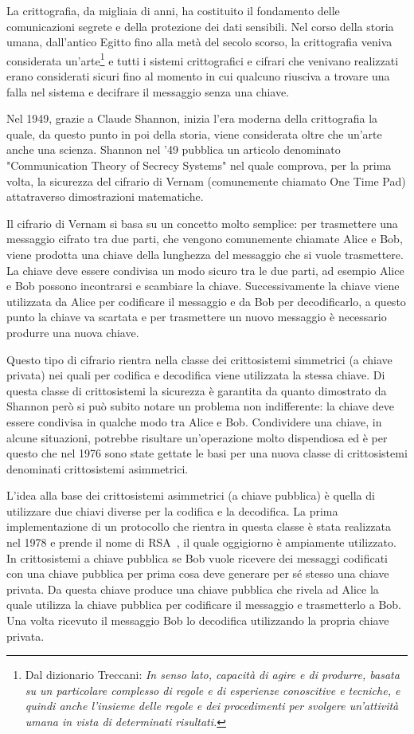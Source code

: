 La crittografia, da migliaia di anni, ha costituito il fondamento delle comunicazioni segrete e della protezione dei dati sensibili. 
Nel corso della storia umana, dall'antico Egitto fino alla met\`a del secolo scorso, la crittografia veniva considerata un'arte\footnote{Dal dizionario Treccani: \textit{In senso lato, capacità di agire e di produrre, basata su un particolare complesso di regole e di esperienze conoscitive e tecniche, e quindi anche l’insieme delle regole e dei procedimenti per svolgere un’attività umana in vista di determinati risultati.}} e tutti i sistemi crittografici e cifrari che venivano realizzati erano considerati sicuri fino al momento in cui qualcuno riusciva a trovare una falla nel sistema e decifrare il messaggio senza una chiave.

Nel 1949, grazie a Claude Shannon, inizia l'era moderna della crittografia la quale, da questo punto in poi della storia, viene considerata oltre che un'arte anche una scienza. Shannon nel '49 pubblica un articolo denominato "Communication Theory of Secrecy Systems"\cite{6769090} nel quale comprova, per la prima volta, la sicurezza del cifrario di Vernam (comunemente chiamato One Time Pad) attatraverso dimostrazioni matematiche.

Il cifrario di Vernam si basa su un concetto molto semplice: per trasmettere una messaggio cifrato tra due parti, che vengono comunemente chiamate Alice e Bob, viene prodotta una chiave della lunghezza del messaggio che si vuole trasmettere. La chiave deve essere condivisa un modo sicuro tra le due parti, ad esempio Alice e Bob possono incontrarsi e scambiare la chiave. Successivamente la chiave viene utilizzata da Alice per codificare il messaggio e da Bob per decodificarlo, a questo punto la chiave va scartata e per trasmettere un nuovo messaggio \`e necessario produrre una nuova chiave. 

Questo tipo di cifrario rientra nella classe dei crittosistemi simmetrici (a chiave privata) nei quali per codifica e decodifica viene utilizzata la stessa chiave. Di questa classe di crittosistemi la sicurezza \`e garantita da quanto dimostrato da Shannon per\`o si pu\`o subito notare un problema non indifferente: la chiave deve essere condivisa in qualche modo tra Alice e Bob. Condividere una chiave, in alcune situazioni, potrebbe risultare un'operazione molto dispendiosa ed \`e per questo che nel 1976 sono state gettate le basi per una nuova classe di crittosistemi denominati crittosistemi asimmetrici\cite{1055638}.

L'idea alla base dei crittosistemi asimmetrici (a chiave pubblica) \`e quella di utilizzare due chiavi diverse per la codifica e la decodifica. La prima implementazione di un protocollo che rientra in questa classe \`e stata realizzata nel 1978 e prende il nome di RSA~\cite{rivest1978method}, il quale oggigiorno \`e ampiamente utilizzato. In crittosistemi a chiave pubblica se Bob vuole ricevere dei messaggi codificati con una chiave pubblica per prima cosa deve generare per s\'e stesso una chiave privata. Da questa chiave produce una chiave pubblica che rivela ad Alice la quale utilizza la chiave pubblica per codificare il messaggio e trasmetterlo a Bob. Una volta ricevuto il messaggio Bob lo decodifica utilizzando la propria chiave privata.

